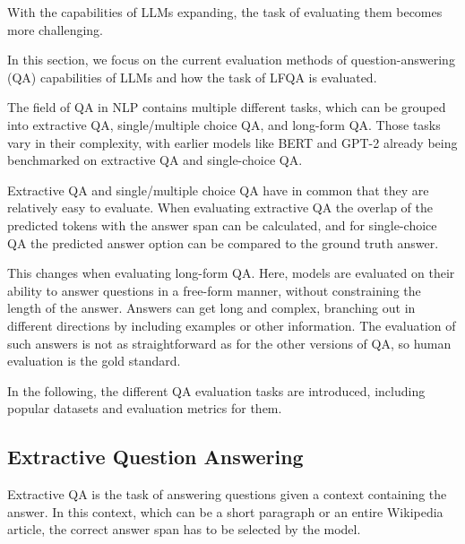 With the capabilities of LLMs expanding, the task of evaluating them becomes more challenging.

In this section, we focus on the current evaluation methods of question-answering (QA) capabilities of LLMs and how the task of LFQA is evaluated.

The field of QA in NLP contains multiple different tasks, which can be grouped into extractive QA, single/multiple choice QA, and long-form QA.
Those tasks vary in their complexity, with earlier models like BERT and GPT-2 already being benchmarked on extractive QA and single-choice QA.

Extractive QA and single/multiple choice QA have in common that they are relatively easy to evaluate.
When evaluating extractive QA the overlap of the predicted tokens with the answer span can be calculated, and for single-choice QA the predicted answer option can be compared to the ground truth answer.

This changes when evaluating long-form QA.
Here, models are evaluated on their ability to answer questions in a free-form manner, without constraining the length of the answer.
Answers can get long and complex, branching out in different directions by including examples or other information.
The evaluation of such answers is not as straightforward as for the other versions of QA, so human evaluation is the gold standard.

In the following, the different QA evaluation tasks are introduced, including popular datasets and evaluation metrics for them.

\subsection{Extractive Question Answering}\label{sec:extractive-qa}
Extractive QA is the task of answering questions given a context containing the answer.
In this context, which can be a short paragraph or an entire Wikipedia article, the correct answer span has to be selected by the model.

